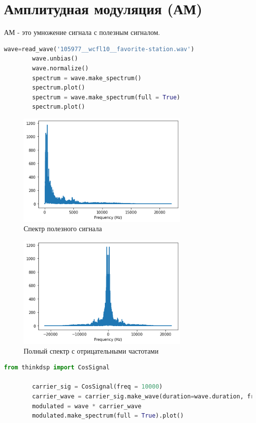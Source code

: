 \documentclass[a4paper, 12pt]{report}
\begin{document}
	\chapter{Амплитудная модуляция (АМ)}
	АМ - это умножение  сигнала с полезным сигналом.
	\begin{lstlisting}[language=Python,caption=Полезный сигнал]
		wave=read_wave('105977__wcfl10__favorite-station.wav')
		wave.unbias()
		wave.normalize()
		spectrum = wave.make_spectrum()
		spectrum.plot()
		spectrum = wave.make_spectrum(full = True)
		spectrum.plot()
	\end{lstlisting}
	\begin{figure}[H]
		\centering
		\includegraphics[width=0.75\textwidth]{am1.png}
		\caption{Спектр полезного сигнала}
		\label{fig:am1}
	\end{figure}
	\begin{figure}[H]
		\centering
		\includegraphics[width=0.75\textwidth]{am2.png}
		\caption{Полный спектр с отрицательными частотами}
		\label{fig:am2}
	\end{figure}
	\begin{lstlisting}[language=Python,caption=Модуляция сигнала косинусоидой]
		from thinkdsp import CosSignal

		carrier_sig = CosSignal(freq = 10000)
		carrier_wave = carrier_sig.make_wave(duration=wave.duration, framerate=wave.framerate)
		modulated = wave * carrier_wave
		modulated.make_spectrum(full = True).plot()
	\end{lstlisting}
\end{document}
